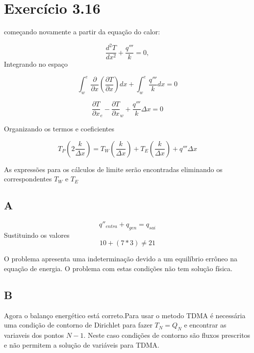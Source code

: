 \documentclass[]{article}
\begin{document}
\section*{Exercício 3.16}

começando novamente a partir da equação do calor:

\begin{equation}
	\frac{d^2 T}{dx^2} + \frac{q'''}{k} = 0,
\end{equation}
Integrando no espaço

\begin{equation}
	\int_{w}^{e} \frac{\partial}{\partial x} \left(  \frac{\partial T}{\partial x} \right) dx +
	\int_{w}^{e} \frac{q'''}{k} dx = 0
\end{equation}

\begin{equation}
	 \frac{\partial T}{\partial x} _{e} -
	 \frac{\partial T}{\partial x} _{w}  +
	\frac{q'''}{k} \Delta x = 0
\end{equation}

Organizando os termos e coeficientes

\begin{equation}
	T_P \left( 2 \frac{k}{\Delta x} \right) =
	T_W \left( \frac{k}{\Delta x} \right) +
	T_E \left( \frac{k}{\Delta x} \right) +
	q''' \Delta x
\end{equation}

As expressões para os cálculos de limite serão encontradas eliminando os correspondentes $T_W$ e $T_E$

\subsection*{A}

\begin{equation}
	q''_{entra} + q_{gen} = q_{sai}
\end{equation}
Sustituindo os valores
\begin{equation}
	10 + (7 * 3) \neq 21
\end{equation}

O problema apresenta uma indeterminação devido a um equilíbrio errôneo na equação de energia. O problema com estas condições não tem solução física.

\subsection*{B}
Agora o balanço energético está correto.Para usar o metodo TDMA é necessária uma condição de contorno de Dirichlet para fazer $T_N = Q_N$ e encontrar as variaveis dos pontos $N-1$. Neste caso condições de contorno são fluxos prescritos e não permitem a solução de variáveis para TDMA.\\
\end{document}
